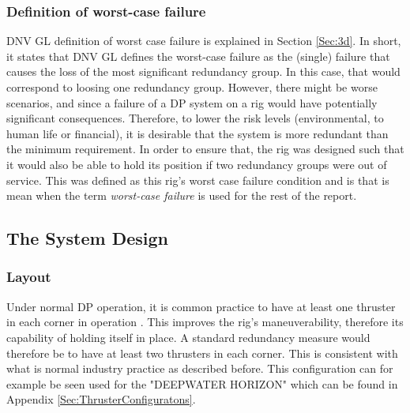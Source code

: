 \subsubsection{Definition of worst-case failure} \label{Sec:worstCaseFailure}
DNV GL definition of worst case failure is explained in Section \ref{Sec:3d}. In short, it states that DNV GL defines the worst-case failure as the (single) failure that causes the loss of the most significant redundancy group. In this case, that would correspond to loosing one redundancy group. However, there might be worse scenarios, and since a failure of a DP system on a rig would have potentially significant consequences. Therefore, to lower the risk levels (environmental, to human life or financial), it is desirable that the system is more redundant than the minimum requirement. In order to ensure that, the rig was designed such that it would also be able to hold its position if two redundancy groups were out of service. This was defined as this rig's worst case failure condition and is that is mean when the term \textit{worst-case failure} is used for the rest of the report. 

\subsection{The System Design}
\subsubsection{Layout}
Under normal DP operation, it is common practice to have at least one thruster in each corner in operation \cite{RedundantDesignIntention_DNV}.
This improves the rig's maneuverability, therefore its capability of holding itself in place. A standard redundancy measure would therefore be to have at least two thrusters in each corner. This is consistent with what is normal industry practice as described before. This configuration can for example be seen used for the "DEEPWATER HORIZON" which can be found in Appendix \ref{Sec:ThrusterConfiguratons}. 

